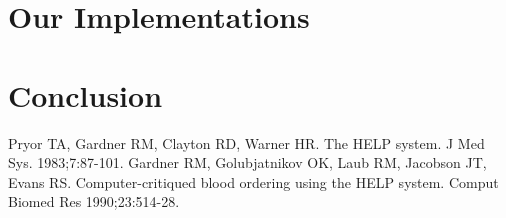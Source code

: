 \documentclass{amia}
\begin{document}
\section*{Our Implementations}

\section*{Conclusion}

\makeatletter
\renewcommand{\@biblabel}[1]{\hfill #1.}
\makeatother


\begin{thebibliography}{1}
\setlength\itemsep{-0.1em}

Pryor TA, Gardner RM, Clayton RD, Warner HR. The HELP system. J Med Sys. 1983;7:87-101.
Gardner RM, Golubjatnikov OK, Laub RM, Jacobson JT, Evans RS. Computer-critiqued blood ordering using the HELP system. Comput Biomed Res 1990;23:514-28.



\end{thebibliography}
\end{document}
